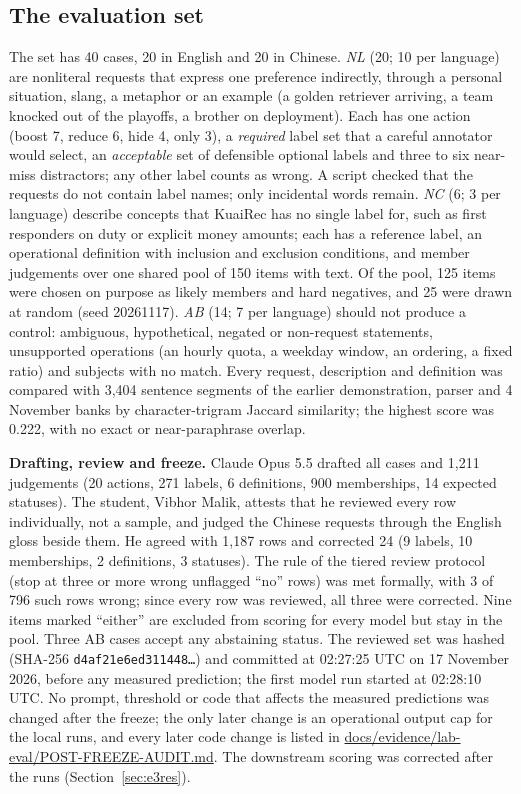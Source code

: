 \documentclass[conference]{IEEEtran}
\begin{document}
\subsection{The evaluation set}
The set has 40 cases, 20 in English and 20 in Chinese. \emph{NL} (20; 10 per language) are nonliteral requests that express one preference indirectly, through a personal situation, slang, a metaphor or an example (a golden retriever arriving, a team knocked out of the playoffs, a brother on deployment). Each has one action (boost 7, reduce 6, hide 4, only 3), a \emph{required} label set that a careful annotator would select, an \emph{acceptable} set of defensible optional labels and three to six near-miss distractors; any other label counts as wrong. A script checked that the requests do not contain label names; only incidental words remain. \emph{NC} (6; 3 per language) describe concepts that KuaiRec has no single label for, such as first responders on duty or explicit money amounts; each has a reference label, an operational definition with inclusion and exclusion conditions, and member judgements over one shared pool of 150 items with text. Of the pool, 125 items were chosen on purpose as likely members and hard negatives, and 25 were drawn at random (seed 20261117). \emph{AB} (14; 7 per language) should not produce a control: ambiguous, hypothetical, negated or non-request statements, unsupported operations (an hourly quota, a weekday window, an ordering, a fixed ratio) and subjects with no match. Every request, description and definition was compared with 3,404 sentence segments of the earlier demonstration, parser and 4 November banks by character-trigram Jaccard similarity; the highest score was 0.222, with no exact or near-paraphrase overlap.

\textbf{Drafting, review and freeze.} Claude Opus 5.5 drafted all cases and 1,211 judgements (20 actions, 271 labels, 6 definitions, 900 memberships, 14 expected statuses). The student, Vibhor Malik, attests that he reviewed every row individually, not a sample, and judged the Chinese requests through the English gloss beside them. He agreed with 1,187 rows and corrected 24 (9 labels, 10 memberships, 2 definitions, 3 statuses). The rule of the tiered review protocol (stop at three or more wrong unflagged ``no'' rows) was met formally, with 3 of 796 such rows wrong; since every row was reviewed, all three were corrected. Nine items marked ``either'' are excluded from scoring for every model but stay in the pool. Three AB cases accept any abstaining status. The reviewed set was hashed (SHA-256 \texttt{d4af21e6ed311448\ldots}) and committed at 02:27:25 UTC on 17 November 2026, before any measured prediction; the first model run started at 02:28:10 UTC. No prompt, threshold or code that affects the measured predictions was changed after the freeze; the only later change is an operational output cap for the local runs, and every later code change is listed in \url{docs/evidence/lab-eval/POST-FREEZE-AUDIT.md}. The downstream scoring was corrected after the runs (Section~\ref{sec:e3res}).
\end{document}
